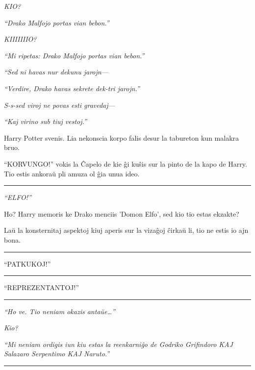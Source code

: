 \emph{KIO?}

\emph{``Drako Malfojo portas vian bebon.''}

\emph{KIIIIIIIO?}

\emph{``Mi ripetas: Drako Malfojo portas vian bebon.''}

\emph{``Sed ni havas nur dekunu jarojn—}

\emph{``Verdire, Drako havas sekrete dek-tri jarojn.''}

\emph{S-s-sed viroj ne povas esti gravedaj—}

\emph{``Kaj virino sub tiuj vestoj.''}

\emph{}

\emph{}

Harry Potter svenis. Lia nekonscia korpo falis desur la tabureton kun
malakra bruo.

``KORVUNGO!'' vokis la Ĉapelo de kie ĝi kuŝis sur la pinto de la kapo
de Harry. Tio estis ankoraŭ pli amuza ol ĝia unua ideo.

\begin{center}\rule{3in}{0.4pt}\end{center}

\emph{``ELFO!''}

Ho? Harry memoris ke Drako menciis 'Domon Elfo', sed kio tio estas
ekzakte?

Laŭ la konsternitaj aspektoj kiuj aperis sur la vizaĝoj ĉirkaŭ li, tio
ne estis io ajn bona.

\begin{center}\rule{3in}{0.4pt}\end{center}

``PATKUKOJ!''

\begin{center}\rule{3in}{0.4pt}\end{center}

``REPREZENTANTOJ!''

\begin{center}\rule{3in}{0.4pt}\end{center}

\emph{``Ho ve. Tio neniam okazis antaŭe\ldots''}

\emph{Kio?}

\emph{``Mi neniam ordigis iun kiu estas la reenkarniĝo de Godriko
  Grifindoro KAJ Salazaro Serpentimo KAJ Naruto.''}

\begin{center}\rule{3in}{0.4pt}\end{center}

